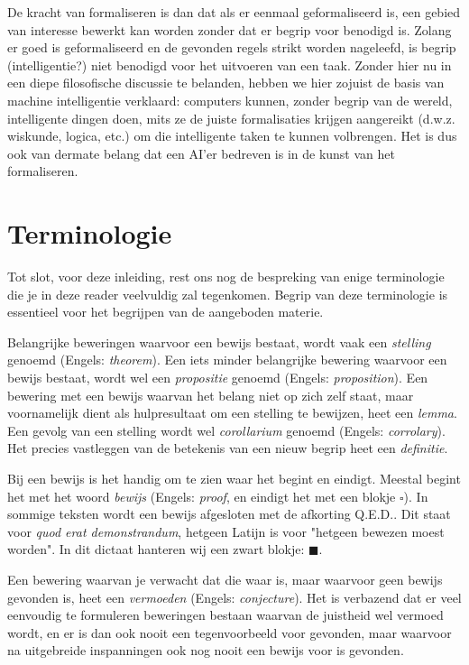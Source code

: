 De kracht van formaliseren is dan dat als er eenmaal geformaliseerd is, een gebied van interesse bewerkt kan worden zonder dat er begrip voor benodigd is. Zolang er goed is geformaliseerd en de gevonden regels strikt worden nageleefd, is begrip (intelligentie?) niet benodigd voor het uitvoeren van een taak. Zonder hier nu in een diepe filosofische discussie te belanden, hebben we hier zojuist de basis van machine intelligentie verklaard: computers kunnen, zonder begrip van de wereld, intelligente dingen doen, mits ze de juiste formalisaties krijgen aangereikt (d.w.z. wiskunde, logica, etc.) om die intelligente taken te kunnen volbrengen. Het is dus ook van dermate belang dat een AI'er bedreven is in de kunst van het formaliseren.

\section{Terminologie}
Tot slot, voor deze inleiding, rest ons nog de bespreking van enige terminologie die je in deze reader veelvuldig zal tegenkomen. Begrip van deze terminologie is essentieel voor het begrijpen van de aangeboden materie.

Belangrijke beweringen waarvoor een bewijs bestaat, wordt vaak een \textit{stelling} genoemd (Engels: \textit{theorem}). Een iets minder belangrijke bewering waarvoor een bewijs bestaat, wordt wel een \textit{propositie} genoemd (Engels: \textit{proposition}). Een bewering met een bewijs waarvan het belang niet op zich zelf staat, maar voornamelijk dient als hulpresultaat om een stelling te bewijzen, heet een \textit{lemma}. Een gevolg van een stelling wordt wel \textit{corollarium} genoemd (Engels: \textit{corrolary}). Het precies vastleggen van de betekenis van een nieuw begrip heet een \textit{definitie}. %

Bij een bewijs is het handig om te zien waar het begint en eindigt. Meestal begint het met het woord \textit{bewijs} (Engels: \textit{proof}, en eindigt het met een blokje $\square$). In sommige teksten wordt een bewijs afgesloten met de afkorting Q.E.D.. Dit staat voor \textit{quod erat demonstrandum}, hetgeen Latijn is voor "hetgeen bewezen moest worden". In dit dictaat hanteren wij een zwart blokje: $\blacksquare$.

Een bewering waarvan je verwacht dat die waar is, maar waarvoor geen bewijs gevonden is, heet een \textit{vermoeden} (Engels: \textit{conjecture}). Het is verbazend dat er veel eenvoudig te formuleren beweringen bestaan waarvan de juistheid wel vermoed wordt, en er is dan ook nooit een tegenvoorbeeld voor gevonden, maar waarvoor na uitgebreide inspanningen ook nog nooit een bewijs voor is gevonden.

